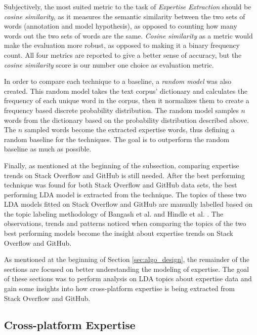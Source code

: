        Subjectively, the most suited metric to the task of \emph{Expertise Extraction} should be \emph{cosine similarity}, as it measures the semantic similarity between the two sets of words (annotation and model hypothesis), as opposed to counting how many words out the two sets of words are the same. \emph{Cosine similarity} as a metric would make the evaluation more robust, as opposed to making it a binary frequency count. All four metrics are reported to give a better sense of accuracy, but the \emph{cosine similarity} score is our number one choice as evaluation metric.
        
        \label{subsec:random_model}In order to compare each technique to a baseline, a \emph{random model} was also created. This random model takes the text corpus' dictionary and calculates the frequency of each unique word in the corpus, then it normalizes them to create a frequency based discrete probability distribution. The random model samples $n$ words from the dictionary based on the probability distribution described above. The $n$ sampled words become the extracted expertise words, thus defining a random baseline for the techniques. The goal is to outperform the random baseline as much as possible.
        
        \label{subsec:topic_labeling}Finally, as mentioned at the beginning of the subsection, comparing expertise trends on Stack Overflow and GitHub is still needed. After the best performing technique was found for both Stack Overflow and GitHub data sets, the best performing LDA model is extracted from the technique. The topics of these two LDA models fitted on Stack Overflow and GitHub are manually labelled based on the topic labeling methodology of Bangash et al. \cite{bangash2019developers} and Hindle et al. \cite{hindle2012relating}. The observations, trends and patterns noticed when comparing the topics of the two best performing models become the insight about expertise trends on Stack Overflow and GitHub.
     
        As mentioned at the beginning of Section \ref{sec:algo_design}, the remainder of the sections are focused on better understanding the modeling of expertise. The goal of these sections was to perform analysis on LDA topics about expertise data and gain some insights into how cross-platform expertise is being extracted from Stack Overflow and GitHub.
    
    \subsection{Cross-platform Expertise\label{RQ2_task}}
    
